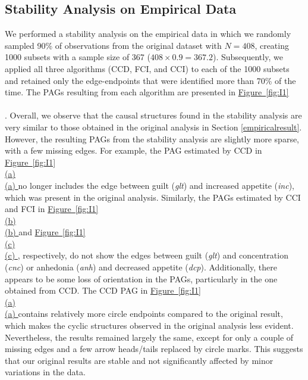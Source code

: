\documentclass[twoside, 11pt]{article}
\newcommand*{\figref}[2][]{%
  \hyperref[{fig:#2}]{%
    Figure~\ref*{fig:#2}%
    \ifx\\#1\\%
    \else
      #1%
    \fi
  }%
}
\begin{document}
\begin{appendices}
\newpage
\vspace*{-1.5cm}
\section{Stability Analysis on Empirical Data}\label{stability}
We performed a stability analysis on the empirical data in which we randomly sampled 90\% of observations from the original dataset with $N = 408$, creating 1000 subsets with a sample size of 367 ($408 \times 0.9 = 367.2$). Subsequently, we applied all three algorithms (CCD, FCI, and CCI) to each of the 1000 subsets and retained only the edge-endpoints that were identified more than 70\% of the time. The PAGs resulting from each algorithm are presented in \figref[]{I1}. 
Overall, we observe that the causal structures found in the stability analysis are very similar to those obtained in the original analysis in Section \ref{empiricalresult}. However, the resulting PAGs from the stability analysis are slightly more sparse, with a few missing edges. For example, the PAG estimated by CCD in \figref[(a)]{I1} no longer includes the edge between guilt (\textit{glt}) and increased appetite (\textit{inc}), which was present in the original analysis. Similarly, the PAGs estimated by CCI and FCI in \figref[(b)]{I1} and \figref[(c)]{I1}, respectively, do not show the edges between guilt (\textit{glt}) and concentration (\textit{cnc}) or anhedonia (\textit{anh}) and decreased appetite (\textit{dcp}). 
Additionally, there appears to be some loss of orientation in the PAGs, particularly in the one obtained from CCD. The CCD PAG in \figref[(a)]{I1} contains relatively more circle endpoints compared to the original result, which makes the cyclic structures observed in the original analysis less evident. 
Nevertheless, the results remained largely the same, except for only a couple of missing edges and a few arrow heads/tails replaced by circle marks. This suggests that our original results are stable and not significantly affected by minor variations in the data.


\end{appendices}
\end{document}
